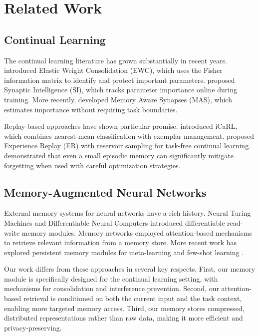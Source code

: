 \documentclass[11pt]{article}
\begin{document}
\section{Related Work}
\label{sec:related}

\subsection{Continual Learning}

The continual learning literature has grown substantially in recent years. \citet{kirkpatrick2017overcoming} introduced Elastic Weight Consolidation (EWC), which uses the Fisher information matrix to identify and protect important parameters. \citet{zenke2017continual} proposed Synaptic Intelligence (SI), which tracks parameter importance online during training. More recently, \citet{aljundi2018memory} developed Memory Aware Synapses (MAS), which estimates importance without requiring task boundaries.

Replay-based approaches have shown particular promise. \citet{rebuffi2017icarl} introduced iCaRL, which combines nearest-mean classification with exemplar management. \citet{rolnick2019experience} proposed Experience Replay (ER) with reservoir sampling for task-free continual learning. \citet{chaudhry2019tiny} demonstrated that even a small episodic memory can significantly mitigate forgetting when used with careful optimization strategies.

\subsection{Memory-Augmented Neural Networks}

External memory systems for neural networks have a rich history. Neural Turing Machines \citep{graves2014neural} and Differentiable Neural Computers \citep{graves2016hybrid} introduced differentiable read-write memory modules. Memory networks \citep{weston2014memory, sukhbaatar2015end} employed attention-based mechanisms to retrieve relevant information from a memory store. More recent work has explored persistent memory modules for meta-learning \citep{santoro2016meta, munkhdalai2017meta} and few-shot learning \citep{kaiser2017learning}.

Our work differs from these approaches in several key respects. First, our memory module is specifically designed for the continual learning setting, with mechanisms for consolidation and interference prevention. Second, our attention-based retrieval is conditioned on both the current input and the task context, enabling more targeted memory access. Third, our memory stores compressed, distributed representations rather than raw data, making it more efficient and privacy-preserving.
\end{document}
